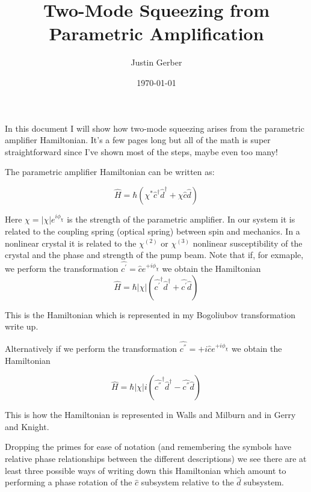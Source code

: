 \documentclass[12pt]{article}
\begin{document}
\title{Two-Mode Squeezing from Parametric Amplification}
\author{Justin Gerber}
\date{\today}
\maketitle

In this document I will show how two-mode squeezing arises from the parametric amplifier Hamiltonian. It's a few pages long but all of the math is super straightforward since I've shown most of the steps, maybe even too many!

The parametric amplifier Hamiltonian can be written as:

\begin{equation}
\hat{H} = \hbar \left(\chi^* \hat{c}^{\dag} \hat{d}^{\dag} + \chi \hat{c} \hat{d}\right)
\end{equation}

Here $\chi = |\chi| e^{i \phi_{\chi}}$ is the strength of the parametric amplifier. In our system it is related to the coupling spring (optical spring) between spin and mechanics. In a nonlinear crystal it is related to the $\chi^{(2)}$ or $\chi^{(3)}$ nonlinear susceptibility of the crystal and the phase and strength of the pump beam.
Note that if, for exmaple, we perform the transformation $\hat{c^{'}} = \hat{c} e^{+i \phi_{\chi}}$ we obtain the Hamiltonian
\begin{equation}
\hat{H} = \hbar |\chi| \left( \hat{c^{'}}^{\dag} \hat{d}^{\dag} + \hat{c^{'}}\hat{d}\right)
\end{equation}

This is the Hamiltonian which is represented in my Bogoliubov transformation write up. 

Alternatively if we perform the transformation $\hat{c^{''}} = +i\hat{c} e^{+i \phi_{\chi}}$ we obtain the Hamiltonian

\begin{equation}
\hat{H} = \hbar |\chi| i \left(\hat{c^{''}}^{\dag}\hat{d}^{\dag} - \hat{c^{''}}\hat{d}\right)
\end{equation}

This is how the Hamiltonian is represented in Walls and Milburn and in Gerry and Knight.

Dropping the primes for ease of notation (and remembering the symbols have relative phase relationships between the different descriptions) we see there are at least three possible ways of writing down this Hamiltonian which amount to performing a phase rotation of the $\hat{c}$ subsystem relative to the $\hat{d}$ subsystem.
\end{document}
